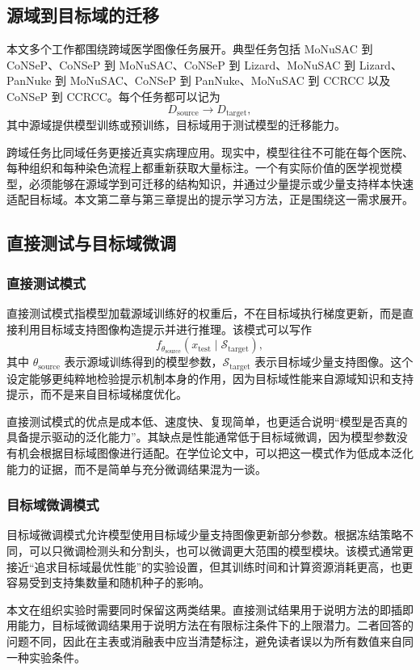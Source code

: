 \subsection{源域到目标域的迁移}
本文多个工作都围绕跨域医学图像任务展开。典型任务包括 MoNuSAC 到 CoNSeP、CoNSeP 到 MoNuSAC、CoNSeP 到 Lizard、MoNuSAC 到 Lizard、PanNuke 到 MoNuSAC、CoNSeP 到 PanNuke、MoNuSAC 到 CCRCC 以及 CoNSeP 到 CCRCC。每个任务都可以记为
\[
D_{\text{source}} \rightarrow D_{\text{target}},
\]
其中源域提供模型训练或预训练，目标域用于测试模型的迁移能力。

跨域任务比同域任务更接近真实病理应用。现实中，模型往往不可能在每个医院、每种组织和每种染色流程上都重新获取大量标注。一个有实际价值的医学视觉模型，必须能够在源域学到可迁移的结构知识，并通过少量提示或少量支持样本快速适配目标域。本文第二章与第三章提出的提示学习方法，正是围绕这一需求展开。

\subsection{直接测试与目标域微调}
\subsubsection{直接测试模式}
直接测试模式指模型加载源域训练好的权重后，不在目标域执行梯度更新，而是直接利用目标域支持图像构造提示并进行推理。该模式可以写作
\[
f_{\theta_{\text{source}}}(x_{\text{test}} \mid \mathcal{S}_{\text{target}}),
\]
其中 $\theta_{\text{source}}$ 表示源域训练得到的模型参数，$\mathcal{S}_{\text{target}}$ 表示目标域少量支持图像。这个设定能够更纯粹地检验提示机制本身的作用，因为目标域性能来自源域知识和支持提示，而不是来自目标域梯度优化。

直接测试模式的优点是成本低、速度快、复现简单，也更适合说明“模型是否真的具备提示驱动的泛化能力”。其缺点是性能通常低于目标域微调，因为模型参数没有机会根据目标域图像进行适配。在学位论文中，可以把这一模式作为低成本泛化能力的证据，而不是简单与充分微调结果混为一谈。

\subsubsection{目标域微调模式}
目标域微调模式允许模型使用目标域少量支持图像更新部分参数。根据冻结策略不同，可以只微调检测头和分割头，也可以微调更大范围的模型模块。该模式通常更接近“追求目标域最优性能”的实验设置，但其训练时间和计算资源消耗更高，也更容易受到支持集数量和随机种子的影响。

本文在组织实验时需要同时保留这两类结果。直接测试结果用于说明方法的即插即用能力，目标域微调结果用于说明方法在有限标注条件下的上限潜力。二者回答的问题不同，因此在主表或消融表中应当清楚标注，避免读者误以为所有数值来自同一种实验条件。

